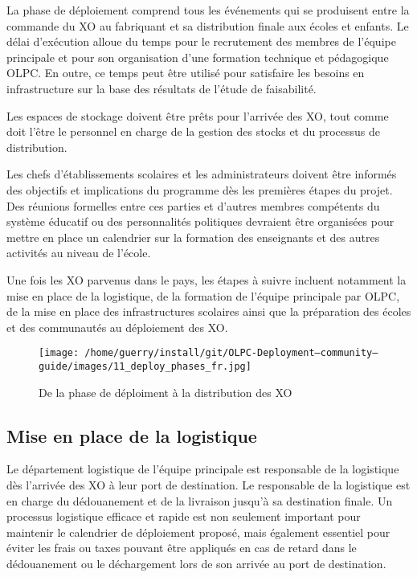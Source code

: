 \documentclass[11pt]{article}
\begin{document}
La phase de déploiement comprend tous les événements qui se produisent
entre la commande du XO au fabriquant et sa distribution finale aux écoles
et enfants. Le délai d'exécution alloue du temps pour le recrutement des
membres de l'équipe principale et pour son organisation d’une formation
technique et pédagogique OLPC. En outre, ce temps peut être utilisé pour
satisfaire les besoins en infrastructure sur la base des résultats de
l'étude de faisabilité.

Les espaces de stockage doivent être prêts pour l'arrivée des XO, tout
comme doit l'être le personnel en charge de la gestion des stocks et du
processus de distribution.

Les chefs d'établissements scolaires et les administrateurs doivent être
informés des objectifs et  implications du programme dès les premières
étapes du projet. Des réunions formelles entre ces parties et d'autres
membres compétents du système éducatif ou des personnalités politiques
devraient être organisées pour mettre en place un calendrier sur la
formation des enseignants et des autres activités au niveau de l'école.

Une fois les XO parvenus dans le pays, les étapes à suivre incluent
notamment la mise en place de la logistique, de la formation de l'équipe
principale par OLPC, de la mise en place des infrastructures scolaires
ainsi que la préparation des écoles et des communautés au déploiement des
XO.

\begin{figure}[htb]
\centering
\texttt{[image: /home/guerry/install/git/OLPC-Deployment--community--guide/images/11\_deploy\_phases\_fr.jpg]}
\caption{De la phase de déploiment à la distribution des XO}
\end{figure}
\subsection{Mise en place de la logistique}
\label{sec-9-1}



Le département logistique de l'équipe principale est responsable de la
logistique dès l'arrivée des XO à leur port de destination. Le responsable
de la logistique est en charge du dédouanement et de la livraison jusqu'à
sa destination finale. Un processus logistique efficace et rapide est non
seulement important pour maintenir le calendrier de déploiement proposé,
mais également essentiel pour éviter les frais ou taxes pouvant être
appliqués en cas de retard dans le dédouanement ou le déchargement lors de
son arrivée au port de destination.
\end{document}
